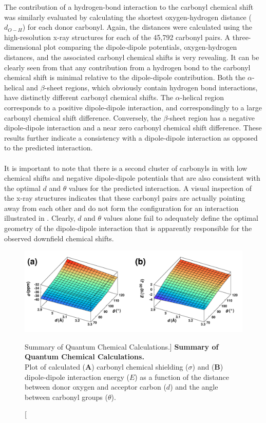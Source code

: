 \begin{doublespace}
The contribution of a hydrogen-bond interaction to the carbonyl \cnmr{}
chemical shift was similarly evaluated by calculating the shortest
oxygen-hydrogen distance ($d_{O-H}$) for each donor carbonyl. Again, the
distances were calculated using the high-resolution x-ray structures for each
of the 45,792 carbonyl pairs. A three-dimensional plot comparing the
dipole-dipole potentials, oxygen-hydrogen distances, and the associated
carbonyl \cnmr{} chemical shifts is very revealing. It can be clearly seen
from  that any contribution from a hydrogen bond
to the \cnmr{} carbonyl chemical shift is minimal relative to the
dipole-dipole contribution. Both the $\alpha$-helical and $\beta$-sheet
regions, which obviously contain hydrogen bond interactions, have
distinctly different \cnmr{} carbonyl chemical shifts.
The $\alpha$-helical region corresponds to a positive dipole-dipole
interaction, and correspondingly to a large carbonyl \cnmr{} chemical shift
difference. Conversely, the $\beta$-sheet region has a negative dipole-dipole
interaction and a near zero carbonyl \cnmr{} chemical shift difference. These
results further indicate a consistency with a dipole-dipole interaction as
opposed to the predicted \npistar{} interaction.
\\\\
It is important to note that there is a second cluster of carbonyls in
 with low \cnmr{} chemical shifts and negative
dipole-dipole potentials that are also consistent with the optimal $d$ and
$\theta$ values for the predicted \npistar{} interaction. A visual inspection
of the x-ray structures indicates that these carbonyl pairs are actually
pointing away from each other and do not form the configuration for an
\npistar{} interaction illustrated in .
Clearly, $d$ and $\theta$ values alone fail to adequately define
the optimal geometry of the dipole-dipole interaction that is
apparently responsible for the observed downfield \cnmr{} chemical shifts.
\end{doublespace}

\begin{figure}[h!]
\includegraphics[width=6in]{figs/npistar/07-surf-a.png}
\caption
      [Summary of Quantum Chemical Calculations.]{
  {\bf Summary of Quantum Chemical Calculations.}
  \\
  Plot of calculated ({\bf A}) carbonyl \cnmr{} chemical shielding ($\sigma$)
  and ({\bf B}) dipole-dipole interaction energy ($E$) as a function of the
  distance between donor oxygen and acceptor carbon ($d$) and the angle
  between carbonyl groups ($\theta$).
}
\label{figure.11.7}
\end{figure}

